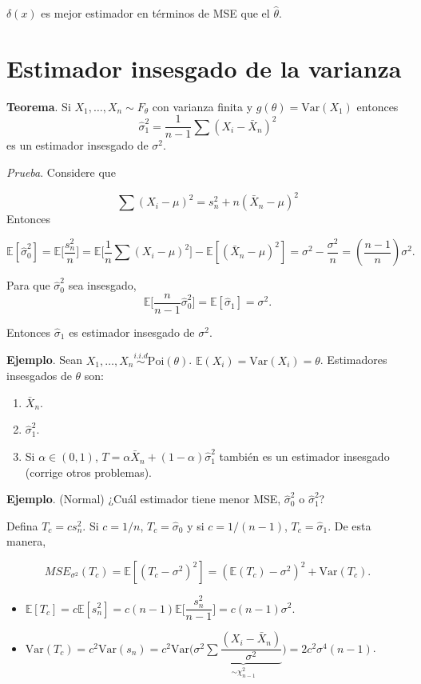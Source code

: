 \documentclass[
  12pt,
]{book}
\begin{document}
\(\delta(x)\) es mejor estimador en términos de MSE que el \(\hat\theta\).

\hypertarget{estimador-insesgado-de-la-varianza}{%
\section{Estimador insesgado de la varianza}\label{estimador-insesgado-de-la-varianza}}

\textbf{Teorema}. Si \(X_1,\dots, X_n \sim F_{\theta}\) con varianza finita y \(g(\theta) = \text{Var}(X_1)\) entonces
\[\hat\sigma_1^2 = \dfrac{1}{n-1}\sum(X_i-\bar X_n)^2\]
es un estimador insesgado de \(\sigma^2\).

\emph{Prueba}. Considere que

\[ \sum (X_i-\mu)^2 = s_n^2 + n(\bar X_n-\mu)^2 \]
Entonces

\[\mathbb E[\hat\sigma_0^2] = \mathbb E \bigg[ \dfrac {s_n^2}n \bigg] =  \mathbb E \bigg[ \dfrac 1n \sum(X_i-\mu)^2\bigg] - \mathbb E[(\bar X_n-\mu)^2] = \sigma^2-\dfrac{\sigma^2}n = \left(\dfrac{n-1}n\right)\sigma^2.\]

Para que \(\hat\sigma_0^2\) sea insesgado,
\[\mathbb E \bigg[\dfrac n{n-1}\hat\sigma_0^2\bigg] = \mathbb E[\hat\sigma_1] = \sigma^2.\]

Entonces \(\hat\sigma_1\) es estimador insesgado de \(\sigma^2\).

\textbf{Ejemplo}. Sean \(X_1,\dots,X_n \overset{i.i.d}{\sim}\text{Poi}(\theta)\). \(\mathbb E(X_i) = \text{Var}(X_i) = \theta\). Estimadores insesgados de \(\theta\) son:

\begin{enumerate}
\def\labelenumi{\arabic{enumi})}
\item
  \(\bar X_n\).
\item
  \(\hat \sigma_1^2\).
\item
  Si \(\alpha \in (0,1)\), \(T = \alpha\bar X_n + (1-\alpha)\hat\sigma_1^2\) también es un estimador insesgado (corrige otros problemas).
\end{enumerate}

\textbf{Ejemplo}. (Normal) ¿Cuál estimador tiene menor MSE, \(\hat\sigma^2_0\) o \(\hat\sigma^2_1\)?

Defina \(T_c = cs_n^2\). Si \(c = 1/n\), \(T_c = \hat\sigma_0\) y si \(c = 1/(n-1)\), \(T_c = \hat\sigma_1\). De esta manera,

\[MSE_{\sigma^2}(T_c) = \mathbb E[(T_c-\sigma^2)^2] =(\mathbb E(T_c)-\sigma^2)^2+\text{Var}(T_c).\]

\begin{itemize}
\item
  \(\mathbb E[T_c] = c\mathbb E[s_n^2] = c(n-1)\mathbb E\bigg[\dfrac{s_n^2}{n-1}\bigg] = c(n-1)\sigma^2\).
\item
  \(\text{Var}(T_c) = c^2\text{Var}(s_n) = c^2\text{Var}\Bigg(\sigma^2\underbrace{\sum\dfrac{(X_i-\bar X_n)}{\sigma^2}}_{\sim\chi^2_{n-1}}\Bigg) = 2c^2\sigma^4(n-1)\).
\end{itemize}
\end{document}
